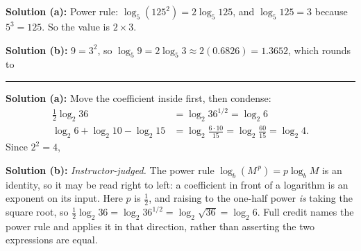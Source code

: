 \documentclass[12pt]{article}
\begin{document}

\textbf{Solution (a):} Power rule: $\log_5\!\left(125^2\right) = 2\log_5 125$,
and $\log_5 125 = 3$ because $5^3 = 125$. So the value is $2 \times 3$.

\textbf{Solution (b):} $9 = 3^2$, so $\log_5 9 = 2\log_5 3 \approx 2(0.6826)
= 1.3652$, which rounds to 

\vspace{0.2cm}\noindent\rule{\linewidth}{0.2pt}\vspace{0.2cm}


\textbf{Solution (a):} Move the coefficient inside first, then condense:
\begin{align*}
  \tfrac{1}{2}\log_2 36 &= \log_2 36^{1/2} = \log_2 6 \\
  \log_2 6 + \log_2 10 - \log_2 15 &= \log_2\!\frac{6 \cdot 10}{15}
    = \log_2\!\frac{60}{15} = \log_2 4 .
\end{align*}
Since $2^2 = 4$, 

\textbf{Solution (b):} \emph{Instructor-judged.} The power rule
$\log_b(M^{\,p}) = p\log_b M$ is an identity, so it may be read right to left:
a coefficient in front of a logarithm is an exponent on its input. Here $p$ is
$\tfrac12$, and raising to the one-half power \emph{is} taking the square root,
so $\tfrac12\log_2 36 = \log_2 36^{1/2} = \log_2\sqrt{36} = \log_2 6$. Full credit
names the power rule and applies it in that direction, rather than asserting the
two expressions are equal.
\end{document}
